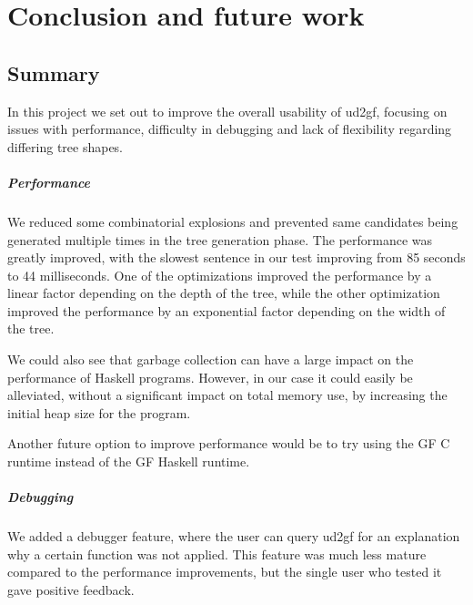 \chapter{Conclusion and future work}
\section{Summary}

In this project we set out to improve the overall usability of ud2gf, focusing on issues with performance, difficulty in debugging and lack of flexibility regarding differing tree shapes.

\paragraph*{Performance}
We reduced some combinatorial explosions and prevented same candidates being generated multiple times in the tree generation phase. The performance was greatly improved, with the slowest sentence in our test improving from 85 seconds to 44 milliseconds. One of the optimizations improved the performance by a linear factor depending on the depth of the tree, while the other optimization improved the performance by an exponential factor depending on the width of the tree.

We could also see that garbage collection can have a large impact on the performance of Haskell programs. However, in our case it could easily be alleviated, without a significant impact on total memory use, by increasing the initial heap size for the program.

Another future option to improve performance would be to try using the GF C runtime instead of the GF Haskell runtime.


\paragraph*{Debugging}
We added a debugger feature, where the user can query ud2gf for an explanation why a certain function was not applied. This feature was much less mature compared to the performance improvements, but the single user who tested it gave positive feedback.

